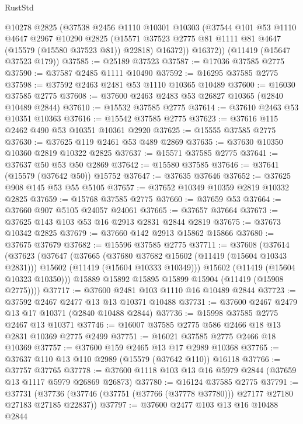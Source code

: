 \begin{lexlean}{RustStd}
\begin{coremodule}
        @10278
        @2825
        (@37538
          @2456
          @1110
          @10301
          @10303
          (@37544
            @101
            @53
            @1110
            @4647
            @2967
            @10290
            @2825
            (@15571 @37523 @2775 @81 @1111 @81 @4647 (@15579 (@15580 @37523 @81)) @22818)
            @16372))
        @16372))
    (@11419 (@15647 @37523 @179))
@37585 := @25189 @37523
@37587 := @17036 @37585 @2775
@37590 := @37587 @2485 @1111 @10490
@37592 := @16295 @37585 @2775
@37598 := @37592 @2463 @2481 @53 @1110 @10365 @10489
@37600 := @16030 @37585 @2775
@37608 := @37600 @2463 @2483 @53 @26827 @10365 (@2840 @10489 @2844)
@37610 := @15532 @37585 @2775
@37614 := @37610 @2463 @53 @10351 @10363
@37616 := @15542 @37585 @2775
@37623 := @37616 @115 @2462 @490 @53 @10351 @10361 @2920
@37625 := @15555 @37585 @2775
@37630 := @37625 @119 @2461 @53 @489 @2869
@37635 := @37630 @10350 @10360 @2819 @10322 @2825
@37637 := @15571 @37585 @2775
@37641 := @37637 @50 @53 @50 @2869
@37642 := @15580 @37585
@37646 := @37641 (@15579 (@37642 @50)) @15752
@37647 := @37635 @37646
@37652 := @37625 @908 @145 @53 @55 @5105
@37657 := @37652 @10349 @10359 @2819 @10332 @2825
@37659 := @15768 @37585 @2775
@37660 := @37659 @53
@37664 := @37660 @907 @5105 @24057 @24061
@37665 := @37657 @37664
@37673 := @37625 @143 @103 @53 @16 @2913 @2831 @2844 @2819
@37675 := @37673 @10342 @2825
@37679 := @37660 @142 @2913 @15862 @15866
@37680 := @37675 @37679
@37682 := @15596 @37585 @2775
@37711 := @37608
    (@37614
      (@37623
        (@37647
          (@37665
            (@37680 @37682 @15602 (@11419 (@15604 @10343 @2831)))
            @15602
            (@11419 (@15604 @10333 @10349)))
          @15602
          (@11419 (@15604 @10323 @10350)))
        @15889
        @15892
        @15895
        @15899
        @15904
        (@11419 (@15908 @2775))))
@37717 := @37600 @2481 @103 @1110 @16 @10489 @2844
@37723 := @37592 @2467 @2477 @13 @13 @10371 @10488
@37731 := @37600 @2467 @2479 @13 @17 @10371 (@2840 @10488 @2844)
@37736 := @15998 @37585 @2775 @2467 @13 @10371
@37746 := @16007 @37585 @2775 @586 @2466 @18 @13 @2831 @10369 @2775 @2499
@37751 := @16021 @37585 @2775 @2466 @18 @10369
@37757 := @37600 @159 @2465 @13 @17 @2989 @10368
@37765 := @37637 @110 @13 @110 @2989 (@15579 (@37642 @110)) @16118
@37766 := @37757 @37765
@37778 := @37600 @1118 @103 @13 @16 @5979 @2844 (@37659 @13 @1117 @5979 @26869 @26873)
@37780 := @16124 @37585 @2775
@37791 := @37731
    (@37736 (@37746 (@37751 (@37766 (@37778 @37780))) @27177 @27180 @27183 @27185 @22837))
@37797 := @37600 @2477 @103 @13 @16 @10488 @2844

\end{coremodule}
\end{lexlean}
